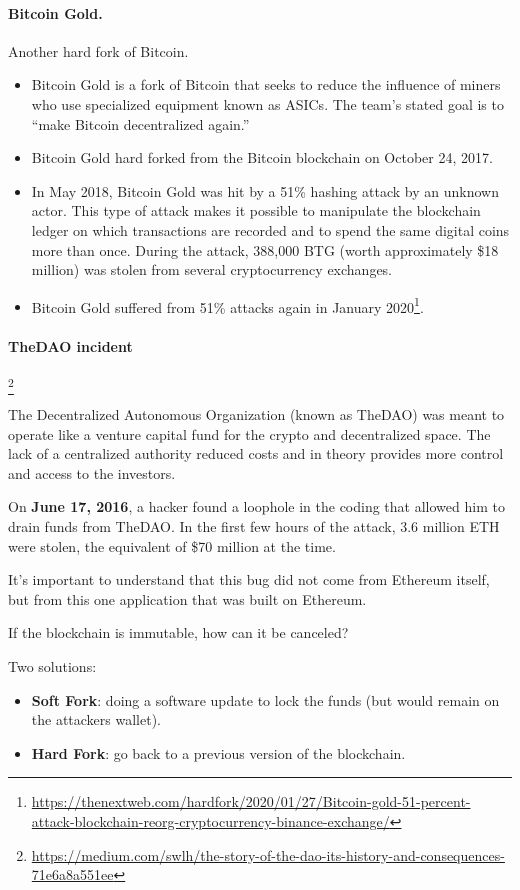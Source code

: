 \paragraph*{Bitcoin Gold.}
Another hard fork of Bitcoin.
\begin{itemize}
	\item Bitcoin Gold is a fork of Bitcoin that seeks to reduce the influence of miners who use specialized equipment known as ASICs. The team's stated goal is to ``make Bitcoin decentralized again.''
	\item Bitcoin Gold hard forked from the Bitcoin blockchain on October 24, 2017.
	\item In May 2018, Bitcoin Gold was hit by a 51\% hashing attack by an unknown actor. This type of attack makes it possible to manipulate the blockchain ledger on which transactions are recorded and to spend the same digital coins more than once. During the attack, 388,000 BTG (worth approximately \$18 million) was stolen from several cryptocurrency exchanges.
	\item Bitcoin Gold suffered from 51\% attacks again in January 2020\footnote{{\scriptsize\url{https://thenextweb.com/hardfork/2020/01/27/Bitcoin-gold-51-percent-attack-blockchain-reorg-cryptocurrency-binance-exchange/}}}.
\end{itemize}

\paragraph{TheDAO incident}\label{dao-incident}\footnote{\url{https://medium.com/swlh/the-story-of-the-dao-its-history-and-consequences-71e6a8a551ee}}

The Decentralized Autonomous Organization (known as TheDAO) was meant to operate like a venture capital fund for the crypto and decentralized space. The lack of a centralized authority reduced costs and in theory provides more control and access to the investors.

On \textbf{June 17, 2016}, a hacker found a loophole in the coding that allowed him to drain funds from TheDAO. In the first few hours of the attack, 3.6 million ETH were stolen, the equivalent of \$70 million at the time.

It’s important to understand that this bug did not come from Ethereum itself, but from this one application that was built on Ethereum.

If the blockchain is immutable, how can it be canceled?

Two solutions:
\begin{itemize}
	\item \textbf{Soft Fork}: doing a software update to lock the funds (but would remain on the attackers wallet).
	\item \textbf{Hard Fork}: go back to a previous version of the blockchain.
\end{itemize}

